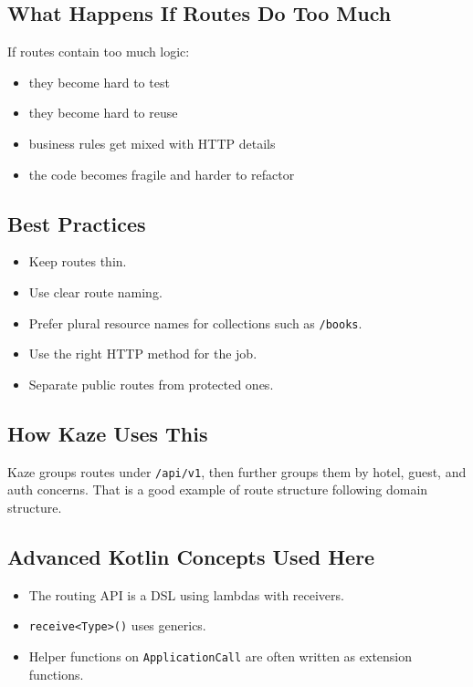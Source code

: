 \documentclass[11pt,a4paper]{article}
\begin{document}
\subsection{What Happens If Routes Do Too Much}

If routes contain too much logic:
\begin{itemize}
    \item they become hard to test
    \item they become hard to reuse
    \item business rules get mixed with HTTP details
    \item the code becomes fragile and harder to refactor
\end{itemize}

\subsection{Best Practices}

\begin{itemize}
    \item Keep routes thin.
    \item Use clear route naming.
    \item Prefer plural resource names for collections such as \texttt{/books}.
    \item Use the right HTTP method for the job.
    \item Separate public routes from protected ones.
\end{itemize}

\subsection{How Kaze Uses This}

Kaze groups routes under \texttt{/api/v1}, then further groups them by hotel, guest, and auth concerns. That is a good example of route structure following domain structure.

\subsection{Advanced Kotlin Concepts Used Here}

\begin{itemize}
    \item The routing API is a DSL using lambdas with receivers.
    \item \texttt{receive<Type>()} uses generics.
    \item Helper functions on \texttt{ApplicationCall} are often written as extension functions.
\end{itemize}
\end{document}
